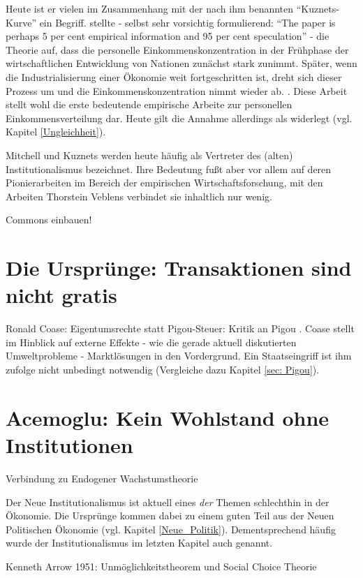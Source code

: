 Heute ist er vielen im Zusammenhang mit der nach ihm benannten "`Kuznets-Kurve"' ein Begriff. \textcite[S. 26]{Kuznets1955} stellte - selbst sehr vorsichtig formulierend: "`The paper is perhaps 5 per cent empirical information and 95 per cent speculation"' - die Theorie auf, dass die personelle Einkommenskonzentration in der Frühphase der wirtschaftlichen Entwicklung von Nationen zunächst stark zunimmt. Später, wenn die Industrialisierung einer Ökonomie weit fortgeschritten ist, dreht sich dieser Prozess um und die Einkommenskonzentration nimmt wieder ab. \parencite{Kuznets1955}. Diese Arbeit stellt wohl die erste bedeutende empirische Arbeite zur personellen Einkommensverteilung dar. Heute gilt die Annahme allerdings als widerlegt (vgl. Kapitel \ref{Ungleichheit}). 

Mitchell und Kuznets werden heute häufig als Vertreter des (alten) Institutionalismus bezeichnet. Ihre Bedeutung fußt aber vor allem auf deren Pionierarbeiten im Bereich der empirischen Wirtschaftsforschung, mit den Arbeiten Thorstein Veblens verbindet sie inhaltlich nur wenig.

Commons einbauen!

\section{Die Ursprünge: Transaktionen sind nicht gratis} \label{sec: Neue Inst}

Ronald Coase: Eigentumsrechte statt Pigou-Steuer: Kritik an Pigou \textcite[S. 243]{Cansier1989}. Coase stellt im Hinblick auf externe Effekte - wie die gerade aktuell diskutierten Umweltprobleme - Marktlösungen in den Vordergrund. Ein Staatseingriff ist ihm zufolge nicht unbedingt notwendig (Vergleiche dazu Kapitel \ref{sec: Pigou}).


\section{Acemoglu: Kein Wohlstand ohne Institutionen}
Verbindung zu Endogener Wachstumstheorie \textcite[S. 633ff]{Snowdon2005}

Der Neue Institutionalismus ist aktuell eines \textit{der} Themen schlechthin in der Ökonomie. Die Ursprünge kommen dabei zu einem guten Teil aus der Neuen Politischen Ökonomie (vgl. Kapitel \ref{Neue_Politik}). Dementsprechend häufig wurde der Institutionalismus im letzten Kapitel auch genannt.

Kenneth Arrow 1951: Unmöglichkeitstheorem und Social Choice Theorie



